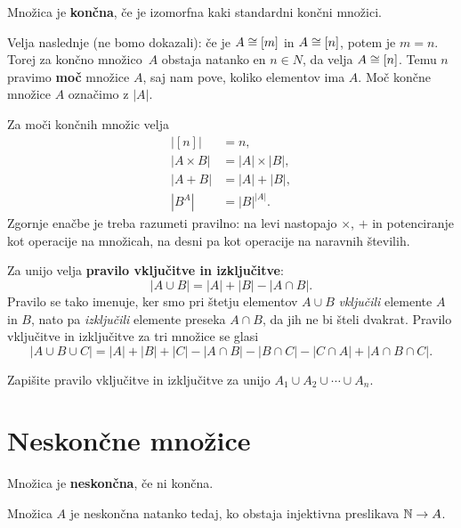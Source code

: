 \begin{definicija}
  Množica je \textbf{končna}, če je izomorfna kaki standardni končni množici.
\end{definicija}


Velja naslednje (ne bomo dokazali): če je $A \cong [m]$ in $A \cong [n]$, potem je $m = n$. Torej za končno
množico~$A$ obstaja natanko en $n \in N$, da velja $A \cong [n]$. Temu $n$ pravimo \textbf{moč} množice $A$,
saj nam pove, koliko elementov ima $A$. Moč končne množice $A$ označimo z $|A|$.

Za moči končnih množic velja
%
\begin{align*}
  |[n]| &= n, \\
  |A \times B| &= |A| \times |B|, \\
  |A + B| &= |A| + |B|, \\
  |B^A| &= |B|^{|A|}.
\end{align*}
%
Zgornje enačbe je treba razumeti pravilno: na levi nastopajo $\times$, $+$ in potenciranje kot operacije na množicah, na desni pa kot operacije na naravnih številih.

Za unijo velja \textbf{pravilo vključitve in izključitve}:
%
\begin{equation*}
 |A \cup B| = |A| + |B| - |A \cap B|.
\end{equation*}
%
Pravilo se tako imenuje, ker smo pri štetju elementov $A \cup B$ \emph{vključili} elemente $A$ in $B$, nato pa \emph{izključili} elemente preseka $A \cap B$, da jih ne bi šteli dvakrat.
%
Pravilo vključitve in izključitve za tri množice se glasi
%
\begin{equation*}
  |A \cup B \cup C| = |A| + |B| + |C| - |A \cap B| - |B \cap C| - |C \cap A| + |A \cap B \cap C|.
\end{equation*}

\begin{naloga}
  Zapišite pravilo vključitve in izključitve za unijo $A_1 \cup A_2 \cup \cdots \cup A_n$.
\end{naloga}


\section{Neskončne množice}

\begin{definicija}
  Množica je \textbf{neskončna}, če ni končna.
\end{definicija}

\begin{izrek}
  Množica $A$ je neskončna natanko tedaj, ko obstaja injektivna preslikava $\mathbb{N} \to A$.
\end{izrek}

